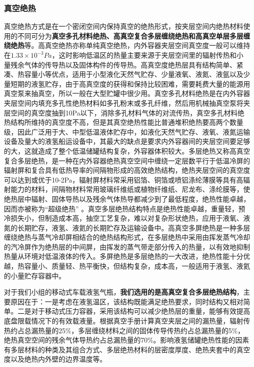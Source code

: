 \documentclass[UTF8,a4paper]{ctexart}
\newcommand{\upcite}[1]{\textsuperscript{\textsuperscript{\cite{#1}}}}
\begin{document}
	\subsubsection{真空绝热}
	真空绝热方式是在一个密闭空间内保持真空的绝热形式，按夹层空间内绝热材料使用的不同可分为\textbf{真空多孔材料绝热、高真空复合多层缠绕绝热和高真空单层多层缠绕绝热}等。高真空绝热亦称单纯真空绝热，内外容器夹层空间真空度一般可以维持在$1.33×10^{-3}Pa$，这时影响低温区的热量主要来源于夹层空间里的辐射传热和小量残余气体的传导热以及固体构件的传导热。高真空度绝热层具有结构简单、紧凑、热容量小等优点，适用于小型液化天然气贮存、少量液氧、液氮、液氩以及少量短期的液氢贮存，由于高真空度的获得和保持比较困难，需要耗费大量的能源用真空泵来抽真空，所以一般在大型贮罐中很少用。真空多孔材料绝热是在内外容器夹层空间内填充多孔性绝热材料如多孔粉末或多孔纤维，然后用机械抽真空泵将夹层空间的真空度抽到10Pa以下，消除多孔材料气体的对流传热，真空多孔材料绝热结构所维持的真空度不高，但是其真空绝热性能比普通堆积绝热要高两个数量级，因此广泛用于大、中型低温液体贮存中，如液化天然气贮存、液氧、液氮运输设备及量大的液氢船运设备中，其最大的缺点是要求内外容器间的夹层空间要足够的大，这就造成了整个低温储罐结构复杂，外容器体积较大。多层绝热又称高真空复合多层绝热，是一种在内外容器绝热真空空间中缠绕一定层数平行于低温冷屏的辐射屏和复合具有低热导率的间隔物形成的高效绝热结构，绝热夹层空间的真空度可以达到或优于10-2Pa，辐射屏材料常采用铝箔、铜箔或喷铝涤纶薄膜等具有高辐射能力的材料，间隔物材料常用玻璃纤维纸或植物纤维纸、尼龙布、涤纶膜等，使绝热层中辐射、固体导热以及残余气体热导都减少到了最低程度，绝热性能卓越，因而亦被称为“超级绝热” \upcite{ref15}。真空多层绝热结构特点是绝热性能卓越，重量轻，预冷损失小，但制造成本高，抽空工艺复杂，难以对复杂形状绝热，应用于液氧、液氮的长期贮存，液氢、液氦的长期贮存及运输设备中。高真空多屏绝热是一种多层缠绕绝热与蒸气冷却屏相结合的绝热结构形式，在多层绝热中采用由挥发蒸气冷却的汽冷屏作为绝热层的中间屏，由挥发的蒸气带走部分传入的热量，以有效地抑制热量从环境对低温液体的传入。多屏绝热是多层绝热的一大改进，绝热性能十分优越，热容量小、质量轻、热平衡快，但结构复杂，成本高，一般适用于液氢、液氦的小量贮存容器中。
	
	对于我们小组的移动式车载液氢气瓶，\textbf{我们选用的是高真空复合多层绝热结构}，主要原因在于：一是考虑在液氢温区，该结构既能满足绝热要求，同时结构又相对简单。二是对于移动式压力容器，采用该结构可以减少绝热层的重量，能够有效提高底盘限载情况下的有效载液量。根据真空手册计算真空夹层之间的漏热量，辐射传热约占总漏热量的25\%，多层缠绕材料之间的固体传导传热约占总漏热量的5\%，绝热真空空间的残余气体导热约占总漏热量的70\%。影响液氢储罐绝热性能的因素有多层材料的种类及其组合方式、多层绝热材料的层密度厚度、绝热夹套中的真空度以及绝热内外壁的边界温度等。
\end{document}
